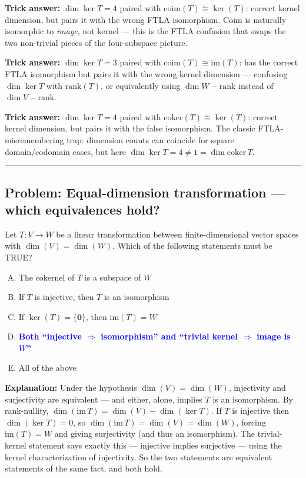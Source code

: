 \documentclass[12pt]{amsart}
\newcommand{\divider}{
  \vspace{-1em}
  \noindent
  \raisebox{-0.15ex}{\textbullet}%
  \hspace{0.5em}%
  \rule[0.5ex]{0.95\textwidth}{1.0pt}%
  \hspace{0.5em}%
  \raisebox{-0.15ex}{\textbullet}%
  \vspace{0em}
}
\begin{document}
\textbf{Trick answer:}
$\dim \ker T = 4$ paired with $\mathrm{coim}(T) \cong \ker(T)$: correct
kernel dimension, but pairs it with the wrong FTLA isomorphism. Coim is
naturally isomorphic to \emph{image}, not kernel --- this is the FTLA
confusion that swaps the two non-trivial pieces of the four-subspace picture.

\textbf{Trick answer:}
$\dim \ker T = 3$ paired with $\mathrm{coim}(T) \cong \mathrm{im}(T)$: has
the correct FTLA isomorphism but pairs it with the wrong kernel dimension
--- confusing $\dim \ker T$ with $\mathrm{rank}(T)$, or equivalently using
$\dim W - \mathrm{rank}$ instead of $\dim V - \mathrm{rank}$.

\textbf{Trick answer:}
$\dim \ker T = 4$ paired with $\mathrm{coker}(T) \cong \ker(T)$: correct
kernel dimension, but pairs it with the false isomorphism. The classic
FTLA-misremembering trap: dimension counts can coincide for square
domain/codomain cases, but here $\dim \ker T = 4 \neq 1 = \dim \mathrm{coker}\, T$.

\divider

\subsection*{Problem: Equal-dimension transformation --- which equivalences hold?}

Let $T: V \to W$ be a linear transformation between finite-dimensional
vector spaces with $\dim(V) = \dim(W)$. Which of the following statements
must be TRUE?

\begin{enumerate}[(A)]
\item The cokernel of $T$ is a subspace of $W$
\item If $T$ is injective, then $T$ is an isomorphism
\item If $\ker(T) = \{\mathbf{0}\}$, then $\mathrm{im}(T) = W$
\item \textcolor{blue}{\textbf{Both ``injective $\Rightarrow$ isomorphism'' and ``trivial kernel $\Rightarrow$ image is $W$''}}
\item All of the above
\end{enumerate}

\textbf{Explanation:}
Under the hypothesis $\dim(V) = \dim(W)$, injectivity and surjectivity are
equivalent --- and either, alone, implies $T$ is an isomorphism. By
rank-nullity, $\dim(\mathrm{im}\, T) = \dim(V) - \dim(\ker T)$. If $T$ is
injective then $\dim(\ker T) = 0$, so $\dim(\mathrm{im}\, T) = \dim(V) = \dim(W)$,
forcing $\mathrm{im}(T) = W$ and giving surjectivity (and thus an isomorphism).
The trivial-kernel statement says exactly this --- injective implies
surjective --- using the kernel characterization of injectivity. So the two
statements are equivalent statements of the same fact, and both hold.
\end{document}
